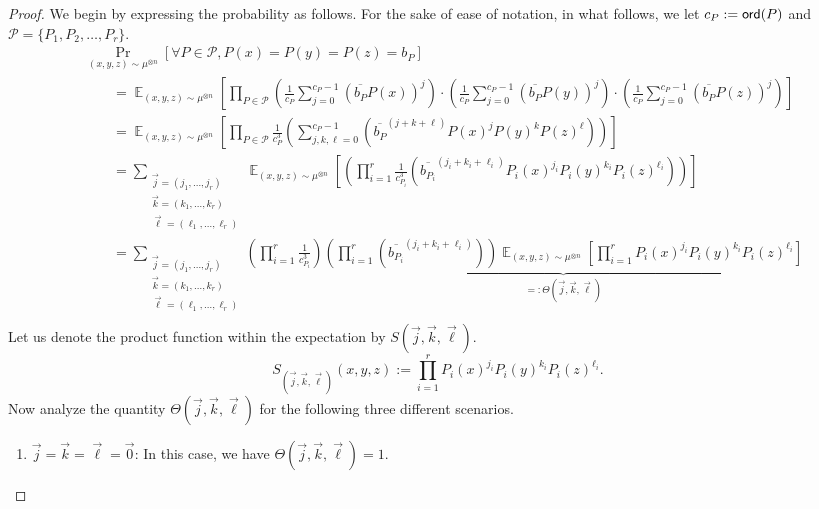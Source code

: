 \documentclass[11pt]{article}
\newcommand\Prob[2]{{\Pr_{#1}\left[ {#2} \right]}}
\newcommand\Expect[2]{{\mathop{\mathbb{E}}_{#1}\left[ {#2} \right]}}
\begin{document}
{    \begin{proof}
      We begin by expressing the probability as follows. For the sake of ease of notation, in what follows, we let $c_P:={\sf ord}(P)$ and $\mathcal{P} = \{ P_1, P_2, \ldots, P_r\}$.
      \begin{align*}
          &\Prob{(x,y,z)\sim\mu^{\otimes n}}{\forall P\in \mathcal{P}, P(x)=P(y)=P(z) = b_P} \\
          &\quad\quad= \Expect{(x,y,z)\sim\mu^{\otimes n}}{\prod_{P\in \mathcal{P}}\left( \frac{1}{c_P} \sum_{j=0}^{c_P-1}\left(\overline{b_P}P(x)\right)^j\right)\cdot \left( \frac{1}{c_P} \sum_{j=0}^{c_P-1}\left(\overline{b_P}P(y)\right)^j\right)\cdot \left( \frac{1}{c_P} \sum_{j=0}^{c_P-1}\left(\overline{b_P}P(z)\right)^j\right)}\\
          &\quad\quad= \Expect{(x,y,z)\sim\mu^{\otimes n}}{\prod_{P\in \mathcal{P}} \frac{1}{c_P^3}\left(  \sum_{j, k, \ell=0}^{c_P-1}\left(\overline{b_P}^{(j+k+\ell)}P(x)^j P(y)^k P(z)^\ell\right)\right)}\\
         &\quad\quad= \sum_{\substack{\vec{j} = (j_1, \ldots, j_r) \\ \vec{k} = (k_1, \ldots, k_r) \\ \vec{\ell} = (\ell_1, \ldots, \ell_r)}}\Expect{(x,y,z)\sim\mu^{\otimes n}}{\left(  \prod_{i=1}^r \frac{1}{c_{P_i}^3}\left(\overline{b_{P_i}}^{(j_i +k_i+\ell_i)} P_i(x)^{j_i} P_i(y)^{k_i} P_i(z)^{\ell_i}\right)\right)}\\
          &\quad\quad= \sum_{\substack{\vec{j} = (j_1, \ldots, j_r) \\ \vec{k} = (k_1, \ldots, k_r) \\ \vec{\ell} = (\ell_1, \ldots, \ell_r)}}  \left(\prod_{i=1}^r \frac{1}{c_{P_i}^3}\right)\underbrace{\left(\prod_{i=1}^r \left(\overline{b_{P_i}}^{(j_i +k_i+\ell_i)}\right) \right) \Expect{(x,y,z)\sim\mu^{\otimes n}}{\prod_{i=1}^r P_i(x)^{j_i} P_i(y)^{k_i} P_i(z)^{\ell_i}}}_{=:\Theta(\vec{j}, \vec{k}, \vec{\ell})}\\
      \end{align*}
     Let us denote the product function within the expectation by $S(\vec{j}, \vec{k}, \vec{\ell})$.
     $$ S_{(\vec{j}, \vec{k}, \vec{\ell})}(x, y, z):= \prod_{i=1}^r P_i(x)^{j_i} P_i(y)^{k_i} P_i(z)^{\ell_i}.$$
     Now analyze the quantity $\Theta(\vec{j}, \vec{k}, \vec{\ell})$ for the following three different scenarios. 
     \begin{enumerate}
         \item[(a)] $\vec{j} = \vec{k} = \vec{\ell} = \vec{0}$: In this case, we have $\Theta(\vec{j}, \vec{k}, \vec{\ell})= 1$.
         

\end{enumerate}
\end{proof}}
\end{document}
